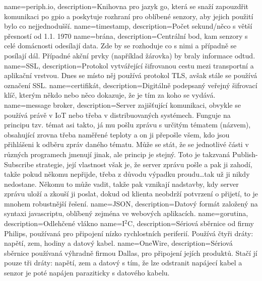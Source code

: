 {
  name={periph.io},
  description={Knihovna pro jazyk \gls{go}, která se snaží zapouzdřit komunikaci po \acrshort{gpio} a poskytuje rozhraní 
  pro oblíbené senzory, aby jejich použití bylo co nejjednodušší. \parencite{periphio}}
}
{
  name={timestamp},
  description={Počet sekund/něco s větší přesností od 1.1. 1970 \parencite{wiki:timestamp}}
}
{
  name={brána},
  description={Centrální bod, kam senzory s celé domácnosti odesílají data. Zde by se rozhoduje co s nimi a případně se 
  posílají dál. Případné akční prvky (například žárovka) by braly informace odtud. \parencite{wiki:gateway}}
}
{
  name={SSL},
  description={Protokol vytvářející šifrovanou cestu mezi transportní a aplikační vrstvou. Dnes se místo něj používá 
  protokol TLS, avšak stále se používá označení SSL. \parencite{wiki:ssl}}
}
{
  name={certifikát},
  description={Digitálně podepsaný veřejný šifrovací klíč, kterým někdo nebo něco dokazuje, že je tím za koho se vydává. 
  \parencite{wiki:certifikat}}
}
{
  name={message broker},
  description={Server zajišťující komunikaci, obvykle se používá právě v IoT nebo třeba v distribuovaných systémech. 
    Funguje na principu tzv. témat asi takto, já mu pošlu zprávu s určitým tématem (názvem), obsahující zrovna třeba 
    naměřené teploty a on ji přepošle všem, kdo jsou přihlášeni k odběru zpráv daného tématu. Může se stát, že se 
    jednotlivé části v různých programech jmenují jinak, ale princip je stejný. Toto je takzvaná Publish-Subscribe 
    strategie, její vlastnost však je, že server zprávu pošle a pak ji zahodí, takže pokud někomu nepřijde, třeba 
    z důvodu výpadku proudu\ldots tak už ji nikdy nedostane. Někomu to může vadit, takže pak vznikají nadstavby, kdy 
    server zprávu uloží a zkouší ji poslat, dokud od klienta neobdrží potvrzení o přijetí, to je mnohem robustnější 
  řešení. \parencite{root.cz:NATS-streaming}}
}
{
  name={JSON},
  description={Datový formát založený na syntaxi javascriptu, oblíbený zejména ve webových aplikacích. 
  \parencite{wiki:json}}
}
{
  name={gorutina},
  description={Odlehčené vlákno \parencite{root.cz:gorutiny}}
}
{
  name={I$^2$C},
  description={Sériová sběrnice od firmy Philips, používaná pro připojení nízko rychlostních periferií. Používá čtyři 
  dráty: napětí, zem, hodiny a datový kabel. \parencite{wiki:twi}}
}
{
  name={OneWire},
  description={Sériová sběrnice používaná výhradně firmou Dallas, pro připojení jejích produktů. Stačí jí pouze tři 
  dráty: napětí, zem a datový s tím, že lze odstranit napájecí kabel a senzor je poté napájen paraziticky s datového 
kabelu. \parencite{wiki:onewire}}
}
